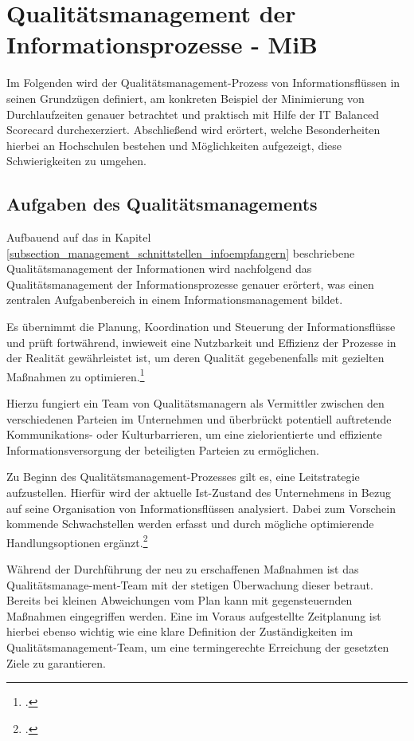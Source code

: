 \section{Qualitätsmanagement der Informationsprozesse - MiB}
\label{section_qualitaetsmanagement_der_informationsprozesse}
Im Folgenden wird der Qualitätsmanagement-Prozess von Informationsflüssen in seinen Grundzügen definiert, 
am konkreten Beispiel der Minimierung von Durchlaufzeiten genauer betrachtet und 
praktisch mit Hilfe der IT Balanced Scorecard durchexerziert. 
Abschließend wird erörtert, welche Besonderheiten hierbei an Hochschulen bestehen 
und Möglichkeiten aufgezeigt, diese Schwierigkeiten zu umgehen.

\subsection{Aufgaben des Qualitätsmanagements}
Aufbauend auf das in Kapitel \ref{subsection_management_schnittstellen_infoempfangern} beschriebene Qualitätsmanagement der Informationen 
wird nachfolgend das Qualitätsmanagement der Informationsprozesse genauer erörtert, was 
einen zentralen Aufgabenbereich in einem Informationsmanagement bildet.

Es übernimmt die Planung, Koordination und Steuerung der Informationsflüsse und prüft fortwährend, inwieweit eine Nutzbarkeit und Effizienz der Prozesse in der Realität gewährleistet ist, um deren Qualität gegebenenfalls mit gezielten Maßnahmen zu optimieren.\footcite[34 ff.]{schroder_wertorientiertes_2005}

Hierzu fungiert ein Team von Qualitätsmanagern als Vermittler zwischen den verschiedenen Parteien im Unternehmen und überbrückt potentiell auftretende Kommunikations- oder Kulturbarrieren, um eine zielorientierte und effiziente Informationsversorgung der beteiligten Parteien zu ermöglichen.

Zu Beginn des Qualitätsmanagement-Prozesses gilt es, eine Leitstrategie aufzustellen. Hierfür wird der aktuelle Ist-Zustand des Unternehmens in Bezug auf seine Organisation von Informationsflüssen analysiert. Dabei zum Vorschein kommende Schwachstellen werden erfasst und durch mögliche optimierende Handlungsoptionen ergänzt.\footcite{helmke_management_2013}

Während der Durchführung der neu zu erschaffenen Maßnahmen ist das 
Qualitätsmanage-ment-Team mit der stetigen Überwachung dieser betraut. 
Bereits bei kleinen Abweichungen vom Plan kann mit gegensteuernden Maßnahmen 
eingegriffen werden. Eine im Voraus aufgestellte Zeitplanung ist hierbei ebenso wichtig wie 
eine klare Definition der Zuständigkeiten im Qualitätsmanagement-Team, um eine 
termingerechte Erreichung der gesetzten Ziele zu garantieren.

